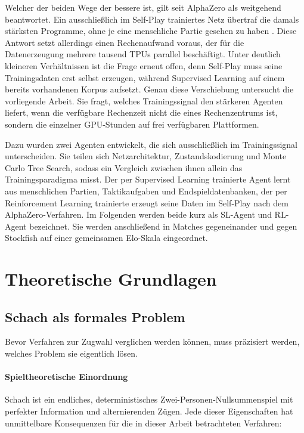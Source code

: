 \documentclass[
  a4paper, 12pt,
  parskip=half,
  headings=small,
  bibliography=totoc
]{scrartcl}
\begin{document}
Welcher der beiden Wege der bessere ist, gilt seit AlphaZero als weitgehend
beantwortet. Ein ausschließlich im Self-Play trainiertes Netz übertraf die damals
stärksten Programme, ohne je eine menschliche Partie gesehen zu haben
\parencite{silver2018}. Diese Antwort setzt allerdings einen Rechenaufwand voraus,
der für die Datenerzeugung mehrere tausend TPUs parallel beschäftigt. Unter
deutlich kleineren Verhältnissen ist die Frage erneut offen, denn Self-Play muss
seine Trainingsdaten erst selbst erzeugen, während Supervised Learning auf einem
bereits vorhandenen Korpus aufsetzt. Genau diese Verschiebung untersucht die
vorliegende Arbeit. Sie fragt, welches Trainingssignal den stärkeren Agenten
liefert, wenn die verfügbare Rechenzeit nicht die eines Rechenzentrums ist,
sondern die einzelner GPU-Stunden auf frei verfügbaren Plattformen.

Dazu wurden zwei Agenten entwickelt, die sich ausschließlich im Trainingssignal
unterscheiden. Sie teilen sich Netzarchitektur, Zustandskodierung und
Monte Carlo Tree Search, sodass ein Vergleich zwischen ihnen allein das
Trainingsparadigma misst. Der per Supervised Learning trainierte Agent lernt aus
menschlichen Partien, Taktikaufgaben und Endspieldatenbanken, der per
Reinforcement Learning trainierte erzeugt seine Daten im Self-Play nach dem
AlphaZero-Verfahren. Im Folgenden werden beide kurz als SL-Agent und RL-Agent
bezeichnet. Sie werden anschließend in Matches gegeneinander
und gegen Stockfish \autocite{stockfish2024} auf einer gemeinsamen Elo-Skala eingeordnet.

\section{Theoretische Grundlagen}

\subsection{Schach als formales Problem}\label{sec:formal}                          %
Bevor Verfahren zur Zugwahl verglichen werden können, muss präzisiert werden, welches Problem sie eigentlich lösen. 
\paragraph{Spieltheoretische Einordnung}
Schach ist ein endliches, deterministisches Zwei-Personen-Nullsummenspiel mit perfekter Information und alternierenden Zügen. Jede dieser Eigenschaften hat unmittelbare Konsequenzen für die in dieser Arbeit betrachteten Verfahren:
\end{document}
